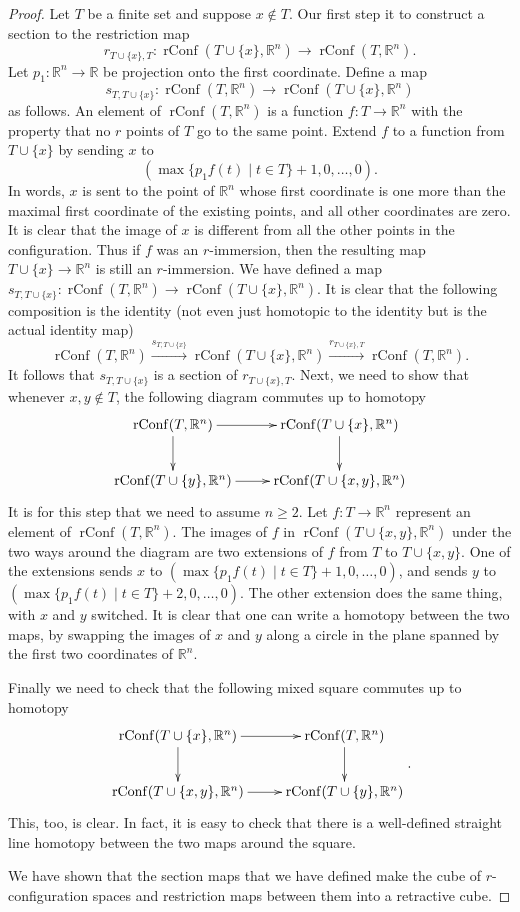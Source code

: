 \documentclass[10pt,a4paper]{amsart}
\newcommand{\R}{{\mathbb R}}
\newcommand{\rConf}{\operatorname{rConf}}
\begin{document}
\begin{proof}
Let $T$ be a finite set and suppose $x\notin T$. Our first step it to construct a section to the restriction map
\[
r_{T\cup\{x\}, T}\colon \rConf(T\cup\{x\}, \R^n)\to \rConf(T, \R^n).
\]
Let $p_1\colon \R^n \to \R$ be projection onto the first coordinate. Define a map
\[
s_{T, T\cup\{x\}}\colon \rConf(T, \R^n) \to \rConf(T\cup\{x\}, \R^n)
\]
as follows. An element of $\rConf(T, \R^n)$ is a function $f\colon T\to \R^n$ with the property that no $r$ points of $T$ go to the same point. Extend $f$ to a function from $T\cup\{x\}$ by sending $x$ to
\[
(\max \{p_1f(t)\mid t\in T\}+1, 0, \ldots, 0).
\]
In words, $x$ is sent to the point of $\R^n$ whose first  coordinate is one more than the maximal first coordinate of the existing points, and all other coordinates are zero. It is clear that the image of $x$ is different from all the other points in the configuration. Thus if $f$ was an $r$-immersion, then the resulting map $T\cup\{x\}\to \R^n$ is still an $r$-immersion. We have defined a map $s_{T, T\cup\{x\}}\colon\rConf(T, \R^n) \to \rConf(T\cup\{x\}, \R^n)$.
It is clear that the following composition is the identity (not even just homotopic to the identity but is the actual identity map)
\[
\rConf(T, \R^n) \xrightarrow{s_{T, T\cup\{x\}}} \rConf(T\cup\{x\}, \R^n)\xrightarrow{r_{T\cup\{x\}, T}}\rConf(T, \R^n).
\]
It follows that $s_{T, T\cup\{x\}}$ is a section of $r_{T\cup\{x\}, T}$. Next, we need to show that whenever $x, y\notin T$, the following diagram commutes up to homotopy
$$
\begin{aligned}
\xymatrix{
\rConf(T,\R^n) \ar[r] \ar[d] & \rConf(T\cup \{x\},\R^n) \ar[d] \\
\rConf(T\cup\{y\},\R^n) \ar[r]       &  \rConf(T\cup\{x,y\},\R^n)
}
\end{aligned}
$$
It is for this step that we need to assume $n\ge 2$. Let $f\colon T\to \R^n$ represent an element of $\rConf(T,\R^n)$. The images of $f$ in $\rConf(T\cup\{x,y\},\R^n)$ under the two ways around the diagram are two extensions of $f$ from $T$ to $T\cup\{x, y\}$. One of the extensions sends $x$ to $(\max \{p_1f(t)\mid t\in T\}+1, 0, \ldots, 0)$, and sends $y$ to $(\max \{p_1f(t)\mid t\in T\}+2, 0, \ldots, 0)$. The other extension does the same thing, with $x$ and $y$ switched. It is clear that one can write a homotopy between the two maps, by swapping the images of $x$ and $y$ along a circle in the plane spanned by the first two coordinates of $\R^n$.

Finally we need to check that the following mixed square commutes up to homotopy
$$
\begin{aligned}
\xymatrix{
\rConf(T \cup\{x\},\R^n) \ar[r] \ar[d] & \rConf(T,\R^n) \ar[d] \\
\rConf(T\cup\{x, y\},\R^n) \ar[r]       &  \rConf(T\cup\{y\},\R^n)
}
\end{aligned}.
$$
This, too, is clear. In fact, it is easy to check that there is a well-defined straight line homotopy between the two maps around the square.

We have shown that the section maps that we have defined make the cube of $r$-configuration spaces and restriction maps between them into a retractive cube.
\end{proof}
\end{document}
